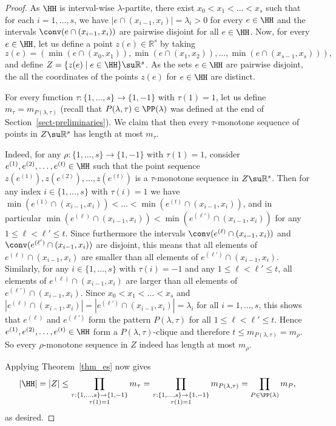 \begin{proof} 
    As $\HH$ is interval-wise $\lambda$-partite, there exist $x_0<x_1<\dots<x_{s}$ such that for each $i=1,\dots,s$, we have $|e\cap (x_{i-1},x_i)|=\lambda_i>0$ for every $e\in \HH$ and the intervals $\conv(e\cap (x_{i-1},x_i))$ are pairwise disjoint for all $e\in \HH$. Now, for every $e\in \HH$, let us define a point $z(e)\in \mathbb{R}^s$ by taking
    \[z(e)=(\min(e\cap (x_{0},x_1)), \min(e\cap (x_{1},x_2)), \dots, \min(e\cap (x_{s-1},x_s))),\]
    and define $Z=\{ z(e)\mid e\in \HH\}\su \mathbb{R}^s$. As the sets $e\in \HH$ are pairwise disjoint, the all the coordinates of the points $z(e)$ for $e\in \HH$ are distinct.
    
    For every function $\tau:\{1,\dots,s\}\to \{1,-1\}$ with $\tau(1)=1$, let us define $m_\tau=m_{P(\lambda,\tau)}$ (recall that $P(\lambda,\tau)\in \PP(\lambda)$ was defined at the end of Section~\ref{sect-preliminaries}). We claim that then every  $\tau$-monotone sequence of points in $Z\su \mathbb{R}^s$ has length at most $m_\tau$.

    Indeed, for any $\rho:\{1,\dots,s\}\to \{1,-1\}$ with $\tau(1)=1$, consider $e^{(1)},e^{(2)},\dots,e^{(t)}\in \HH$ such that the point sequence $z(e^{(1)}),z(e^{(2)}),\dots,z(e^{(t)})$ is a $\tau$-monotone sequence in $Z \su \mathbb{R}^s$. Then for any index $i\in \{1,\dots,s\}$ with $\tau(i)=1$ we have  $\min(e^{(1)}\cap (x_{i-1},x_i))< \dots <\min(e^{(t)}\cap (x_{i-1},x_i))$, and in particular $\min(e^{(\ell)}\cap (x_{i-1},x_i))<\min(e^{(\ell')}\cap (x_{i-1},x_i))$ for any $1\le \ell<\ell'\le t$. Since furthermore the intervals $\conv(e^{(\ell)}\cap (x_{i-1},x_i))$ and $\conv(e^{(\ell')}\cap (x_{i-1},x_i))$ are disjoint, this means that all elements of $e^{(\ell)}\cap (x_{i-1},x_i)$ are smaller than all elements of $e^{(\ell')}\cap (x_{i-1},x_i)$. Similarly, for any $i\in \{1,\dots,s\}$ with $\tau(i)=-1$ and any $1\le \ell<\ell'\le t$, all elements of $e^{(\ell)}\cap (x_{i-1},x_i)$ are larger than all elements of $e^{(\ell')}\cap (x_{i-1},x_i)$. Since $x_0<x_1<\dots<x_{s}$ and $|e^{(\ell)}\cap (x_{i-1},x_i)|=|e^{(\ell')}\cap (x_{i-1},x_i)|=\lambda_i$ for all  $i=1,\dots,s$, this shows that  $e^{(\ell)}$ and $e^{(\ell')}$ form the pattern $P(\lambda,\tau)$ for all $1\le \ell<\ell'\le t$. Hence $e^{(1)},e^{(2)},\dots,e^{(t)}\in \HH$ form a $P(\lambda,\tau)$-clique and therefore $t\le m_{P(\lambda,\tau)}=m_\rho$. So every $\rho$-monotone sequence in $Z$ indeed has length at most $m_\rho$.

    Applying Theorem~\ref{thm_es} now gives
    \[|\HH|=|Z|\le \prod_{\substack{\tau:\{1,\dots,s\}\to \{1,-1\}\\ \tau(1)=1}} m_{\tau}=\prod_{\substack{\tau:\{1,\dots,s\}\to \{1,-1\}\\ \tau(1)=1}} m_{P(\lambda,\tau)}=\prod_{P\in \PP(\lambda)} m_{P},\]
    as desired.
\end{proof}

